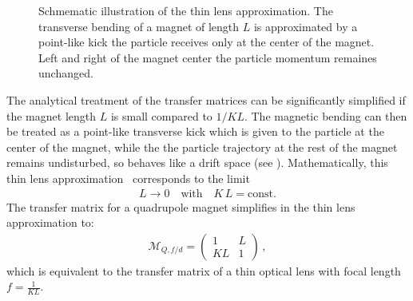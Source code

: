 \begin{figure}[b]  
  \centering
  \caption{Schmematic illustration of the thin lens approximation. The transverse bending of a magnet of length $L$ is approximated by a point-like kick the particle receives only at the center of the magnet. Left and right of the magnet center the particle momentum remaines unchanged.}
  \label{pic:thinlens}
\end{figure}









The analytical treatment of the transfer matrices can be significantly simplified if the magnet length $L$ is small compared to $1/KL$. The magnetic bending can then be treated as a point-like transverse kick which is given to the particle at the center of the magnet, while the the particle trajectory at the rest of the magnet remains undisturbed, so behaves like a drift space (see ). Mathematically, this thin lens approximation~\cite{CERN-SL-95-12} corresponds to the limit
\begin{align}
  L \rightarrow 0 \quad \text{with} \quad K \, L = \text{const.} 
\end{align} 
The transfer matrix for a quadrupole magnet simplifies in the thin lens approximation to:
\begin{align}
  \mathcal{M}_{Q,f/d} = \begin{pmatrix}  1 & L \\   KL & 1  \end{pmatrix} \, ,
\end{align}
which is equivalent to the transfer matrix of a thin optical lens with focal length $f=\frac{1}{KL}$.
%
